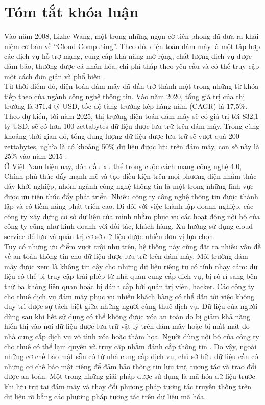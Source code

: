 \chapter*{Tóm tắt khóa luận}
Vào năm 2008, Lizhe Wang, một trong những ngọn cờ tiên phong đã đưa ra khái
niệm cơ bản về “Cloud Computing”. Theo đó, điện toán đám mây là một tập hợp các
dịch vụ hỗ trợ mạng, cung cấp khả năng mở rộng, chất lượng dịch vụ được đảm bảo,
thường được cá nhân hóa, chi phí thấp theo yêu cầu và có thể truy cập một cách đơn giản
và phổ biến \cite{wang2008scientific}.\\
\indent
Từ thời điểm đó, điện toán đám mây đã dần trở thành một trong những từ khóa
tiếp theo của ngành công nghệ thông tin. Vào năm 2020, tổng giá trị của thị trường là
371,4 tỷ USD, tốc độ tăng trưởng kép hàng năm (CAGR) là 17,5\%. Theo dự kiến, tới
năm 2025, thị trường điện toán đám mây sẽ có giá trị tới 832,1 tỷ USD, sẽ có hơn 100
zettabytes dữ liệu được lưu trữ trên đám mây. Trong cùng khoảng thời gian đó, tổng
dung lượng dữ liệu được lưu trữ sẽ vượt quá 200 zettabytes, nghĩa là có khoảng 50\% dữ
liệu được lưu trên đám mây, con số này là 25\% vào năm 2015 \cite{vladimir2021cloudcomputing}.\\
\indent
Ở Việt Nam hiện nay, đón đầu xu thế trong cuộc cách mạng công nghệ 4.0, Chính
phủ thúc đẩy mạnh mẽ và tạo điều kiện trên mọi phương diện nhằm thúc đẩy khởi nghiệp,
nhóm ngành công nghệ thông tin là một trong những lĩnh vực được ưu tiên thúc đẩy phát
triển. Nhiều công ty công nghệ thông tin được thành lập và có tiềm năng phát triển cao.
Đi đôi với việc thành lập doanh nghiệp, các công ty xây dựng cơ sở dữ liệu của mình
nhằm phục vụ các hoạt động nội bộ của công ty cũng như kinh doanh với đối tác, khách
hàng. Xu hướng sử dụng cloud service để lưu và quản trị cơ sở dữ liệu được nhiều đơn
vị lựa chọn.\\
\indent Tuy có những ưu điểm vượt trội như trên, hệ thống này cũng đặt ra nhiều vấn đề
về an toàn thông tin cho dữ liệu được lưu trữ trên đám mây. Môi trường đám mây được
xem là không tin cậy cho những dữ liệu riêng tư có tính nhạy cảm: dữ liệu có thể bị truy
cập trái phép từ nhà quản cung cấp dịch vụ, bị rò rỉ sang bên thứ ba không liên quan hoặc
bị đánh cắp bởi quản trị viên, hacker. Các công ty cho thuê dịch vụ đám mây phục vụ
nhiều khách hàng có thể dẫn tới việc không duy trì được sự tách biệt giữa những người cùng thuê dịch vụ. Dữ liệu của người dùng sau khi hết sử dụng có thể không được xóa an toàn do bị giảm khả năng hiển thị vào nơi dữ liệu được lưu trữ vật lý trên đám mây hoặc bị mất mát do nhà cung cấp dịch vụ vô tình xóa hoặc thảm họa. Người dùng nội bộ của công ty cho thuê có thể lạm quyền và truy cập nhằm đánh cắp thông tin \cite{timothy2018risk}. Do vậy, ngoài những cơ chế bảo mật sẵn có từ nhà cung cấp dịch vụ, chủ sở hữu dữ liệu cần có những cơ chế bảo mật riêng để đảm bảo thông tin lưu trữ, tương tác và trao đổi được an toàn. Một trong những giải pháp được sử dụng là mã hóa dữ liệu trước khi lưu trữ tại đám mây và thay đổi phương pháp tương tác truyền thống trên dữ liệu rõ bằng các phương pháp tương tác trên dữ liệu mã hóa. \\ 
